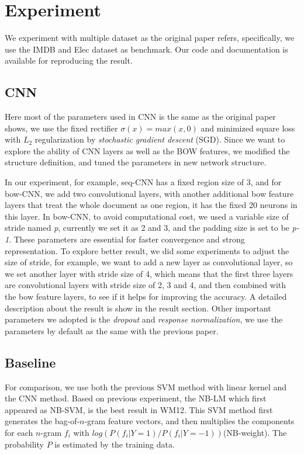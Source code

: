 \section{Experiment}
\label{ssec:exp}

We experiment with multiple dataset as the original paper\cite{DBLP:journals/corr/Johnson014} refers, specifically, we use the IMDB and Elec
dataset as benchmark. Our code and documentation is available for reproducing the result.

\subsection{CNN}
Here most of the parameters used in CNN is the same as the original paper shows, we use the fixed rectifier
$\sigma{(x)} = max(x, 0)$ and minimized square loss with $L_{2}$ regularization by \textit{stochastic gradient descent}
(SGD). Since we want to explore the ability of CNN layers as well as the BOW features, we modified the
structure definition, and tuned the parameters in new network structure.

In our experiment, for example, seq-CNN has a fixed region size of 3, and for bow-CNN, we add two convolutional
layers, with another additional bow feature layers that treat the whole document as one region, it has the fixed 20 neurons
in this layer. In bow-CNN, to avoid computational cost, we used a variable size of stride named \textit{p}, currently
we set it as 2 and 3, and the padding size is set to be \textit{p-1}. These parameters are essential for faster
convergence and strong representation. To explore better result, we did some experiments to adjust the size of stride,
for example, we want to add a new layer as convolutional layer, so we set another layer with stride size of 4, which means
that the first three layers are convolutional layers with stride size of 2, 3 and 4, and then combined with the bow feature
layers, to see if it helps for improving the accuracy. A detailed description about the result is show in the result
section. Other important parameters we adopted is the \textit{dropout}\cite{hinton2012improving} and \textit{response normalization}\cite{krizhevsky2012imagenet}, we use the
parameters by default as the same with the previous paper.

\subsection{Baseline}
For comparison, we use both the previous SVM method with linear kernel and the CNN method. Based on previous experiment, the
NB-LM which first appeared as NB-SVM, is the best result in WM12\cite{wang2012baselines}. This SVM method first generates the bag-of-$n$-gram
feature vectors, and then multiplies the components for each $n$-gram $f_{i}$ with $log(P(f_i|Y=1)/P(f_i|Y=-1))$(NB-weight).
The probability $P$ is estimated by the training data.

